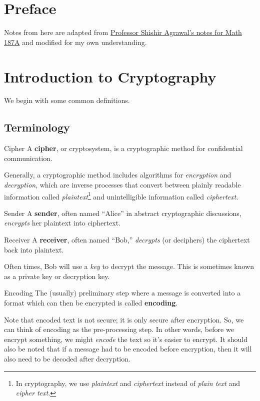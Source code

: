 \documentclass[letterpaper]{article}
\begin{document}
\section*{Preface}
Notes from here are adapted from \href{https://sagrawalx.github.io/assets/crypt/}{Professor Shishir Agrawal's notes for Math 187A} and modified for my own understanding.

\section{Introduction to Cryptography}
We begin with some common definitions.

\subsection{Terminology}
\begin{definition}{Cipher}{}
    A \textbf{cipher}, or cryptosystem, is a cryptographic method for confidential communication. 
\end{definition}
Generally, a cryptographic method includes algorithms for \emph{encryption} and \emph{decryption}, which are inverse processes that convert between plainly readable information called \emph{plaintext}\footnote{In cryptography, we use \emph{plaintext} and \emph{ciphertext} instead of \emph{plain text} and \emph{cipher text}.} and unintelligible information called \emph{ciphertext}.

\begin{definition}{Sender}{}
    A \textbf{sender}, often named ``Alice'' in abstract cryptographic discussions, \emph{encrypts} her plaintext into ciphertext. 
\end{definition}

\begin{definition}{Receiver}{}
    A \textbf{receiver}, often named ``Bob,'' \emph{decrypts} (or deciphers) the ciphertext back into plaintext. 
\end{definition}
Often times, Bob will use a \emph{key} to decrypt the message. This is sometimes known as a private key or decryption key.

\begin{definition}{Encoding}{}
    The (usually) preliminary step where a message is converted into a format which can then be encrypted is called \textbf{encoding}. 
\end{definition}
Note that encoded text is not secure; it is only secure after encryption. So, we can think of encoding as the pre-processing step. In other words, before we encrypt something, we might \emph{encode} the text so it's easier to encrypt. It should also be noted that if a message had to be encoded before encryption, then it will also need to be decoded after decryption. 
\end{document}
